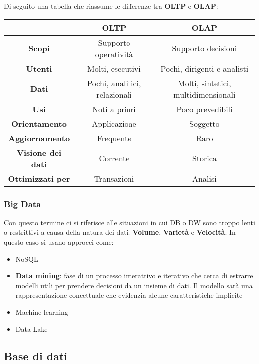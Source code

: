 Di seguito una tabella che riassume le differenze tra \textbf{OLTP} e \textbf{OLAP}:
\begin{center}
	\begin{tabular}{|c|c|c|}
		\hline
		& \textbf{OLTP} & \textbf{OLAP} \\
		\hline
		\textbf{Scopi} & Supporto operatività & Supporto decisioni \\
		\hline
		\textbf{Utenti} & Molti, esecutivi & Pochi, dirigenti e analisti \\
		\hline
		\textbf{Dati} & Pochi, analitici, relazionali & Molti, sintetici, multidimensionali \\
		\hline
		\textbf{Usi} & Noti a priori & Poco prevedibili \\
		\hline
		\textbf{Orientamento} & Applicazione & Soggetto \\
		\hline
		\textbf{Aggiornamento} & Frequente & Raro \\
		\hline
		\textbf{Visione dei dati} & Corrente & Storica \\
		\hline
		\textbf{Ottimizzati per} & Transazioni & Analisi \\
		\hline
	\end{tabular}
\end{center}

\subsubsection{Big Data}
Con questo termine ci si riferisce alle situazioni in cui DB o DW sono troppo lenti o restrittivi a causa della natura dei dati: \textbf{Volume}, \textbf{Varietà} e \textbf{Velocità}. In questo caso si usano approcci come:
\begin{itemize}
	\item NoSQL
	\item \textbf{Data mining}: fase di un processo interattivo e iterativo che cerca di estrarre modelli
	utili per prendere decisioni da un insieme di dati. Il modello sarà una rappresentazione concettuale che evidenzia alcune caratteristiche implicite
	\item Machine learning
	\item Data Lake
\end{itemize}

\subsection{Base di dati}

